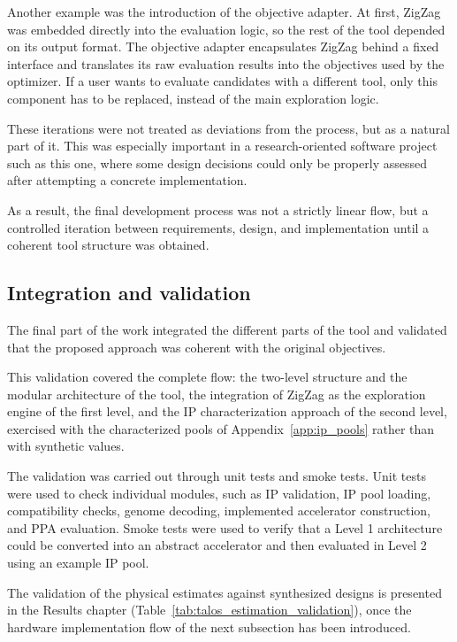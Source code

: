 Another example was the introduction of the objective adapter. At
first, ZigZag was embedded directly into the evaluation logic, so the
rest of the tool depended on its output format. The objective adapter
encapsulates ZigZag behind a fixed interface and translates its raw
evaluation results into the objectives used by the optimizer. If a
user wants to evaluate candidates with a different tool, only this
component has to be replaced, instead of the main exploration logic.

These iterations were not treated as deviations from the process, but
as a natural part of it. This was especially important in a
research-oriented software project such as this one, where some
design decisions could only be properly assessed after attempting a
concrete implementation.

As a result, the final development process was not a strictly linear
flow, but a controlled iteration between requirements, design, and
implementation until a coherent tool structure was obtained.

\subsection{Integration and validation}
The final part of the work integrated the different parts of the tool
and validated that the proposed approach was coherent with the
original objectives.

This validation covered the complete flow: the two-level structure and
the modular architecture of the tool, the integration of ZigZag as the
exploration engine of the first level, and the IP characterization
approach of the second level, exercised with the characterized pools of
Appendix~\ref{app:ip_pools} rather than with synthetic values.

The validation was carried out through unit tests and smoke tests.
Unit tests were used to check individual modules, such as IP
validation, IP pool loading, compatibility checks, genome decoding,
implemented accelerator construction, and PPA evaluation. Smoke tests
were used to verify that a Level 1 architecture could be converted
into an abstract accelerator and then evaluated in Level 2 using an
example IP pool.

The validation of the physical estimates against synthesized designs
is presented in the Results chapter
(Table~\ref{tab:talos_estimation_validation}), once the hardware
implementation flow of the next subsection has been introduced.


